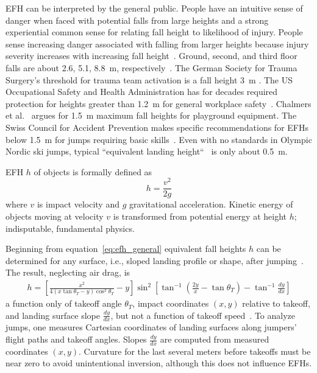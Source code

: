 \documentclass[smallextended]{svjour3}       %
\begin{document}
EFH can be interpreted by the general public. People have an intuitive sense of
danger when faced with potential falls from large heights and a strong
experiential common sense for relating fall height to likelihood of injury. 
People sense increasing danger associated with falling from larger heights because injury severity increases with increasing fall height~\cite{Nau2021}.
Ground, second, and third floor falls are about 2.6, 5.1, 8.8~\si{\meter},
respectively~\cite{Vish2005}. The German Society for Trauma Surgery's threshold for trauma team activation is a fall height 3~\si{\meter} \cite{PolytraumaGuidelineUpdateGroup2018}. The US Occupational Safety and Health
Administration has for decades required protection for heights greater than 1.2~\si{\meter} for
general workplace safety~\cite{OSHA2021}.  Chalmers et al.~\cite{Chalmers1996}
argues for 1.5~\si{\meter} maximum fall heights for playground equipment. The
Swiss Council for Accident Prevention makes specific recommendations for EFHs
below 1.5~\si{\meter} for jumps requiring basic skills~\cite{Heer2019}.
Even with no standards in Olympic Nordic ski jumps, typical ``equivalent
landing height``~\cite{Gasser2018} is only about 0.5~\si{\meter}.

EFH $h$ of objects is formally defined as
%
\begin{equation}
  h = \frac{v^2}{2g}
  \label{eq:efh_general}
\end{equation}
%
where $v$ is impact velocity and $g$ gravitational acceleration.  Kinetic
energy of objects moving at  velocity $v$  is transformed from potential energy
at height $h$; indisputable, fundamental physics.

Beginning from equation~\ref{eq:efh_general} equivalent fall heights $h$ can be
determined for any surface, i.e., sloped landing profile or shape, after
jumping~\cite{Petrone2017}. The result, neglecting air drag, is
%
\begin{align}
  h = \left[\frac{x^2}{4(x\tan\theta_T - y)\cos^{2}\theta_T} - y\right]
    \sin^{2}
    \left[\tan^{-1}\left(\frac{2y}{x} - \tan\theta_T\right) -
    \tan^{-1}\frac{dy}{dx}\right]
  \label{eq:efh}
\end{align}
%
a function only of takeoff angle $\theta_T$, impact coordinates $(x,y)$
relative to takeoff, and landing surface slope $\frac{dy}{dx}$, but not a
function of takeoff speed~\cite{Petrone2017}. To analyze jumps, one measures
Cartesian coordinates of landing surfaces along jumpers' flight paths and
takeoff angles. Slopes $\frac{dy}{dx}$ are computed from measured coordinates
$(x,y)$. Curvature for the last several meters before takeoffs must be near
zero to avoid unintentional inversion, although this does not influence EFHs.
\end{document}
